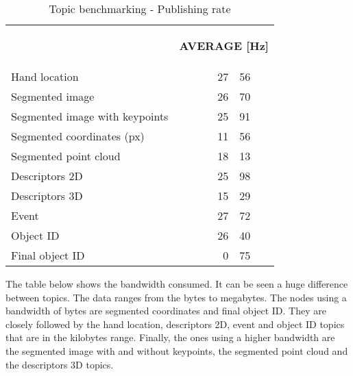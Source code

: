 \begin{itemize}
\begin{table}[H]
\centering
\caption[Topic benchmarking - Publishing rate]{Topic benchmarking - Publishing rate}
\begin{tabular} {l c r@{.}l }
\toprule
\addlinespace[3mm]
   \multicolumn{1}{c}{\begin{center}\textbf{TOPIC}\end{center}} &
   \multicolumn{3}{c}{\begin{center}\textbf{AVERAGE [Hz]}\end{center}} &\\
\addlinespace[-3mm]
\midrule
 Hand location && 27&56 \\
 Segmented  image & & 26&70 \\
 Segmented  image  with  keypoints & &25&91 \\
 Segmented  coordinates  (px) & &11&56 \\
 Segmented  point  cloud & &18&13 \\
 Descriptors  2D && 25&98 \\
 Descriptors  3D & &15&29 \\
Event && 27&72 \\
 Object ID && 26&40 \\
 Final  object  ID && 0&75 \\
\bottomrule
\end{tabular}
\label{hz}
\end{table}



			The table below shows the bandwidth consumed. 
			It can be seen a huge difference between topics. 
			The data ranges from the bytes to megabytes. 
			The nodes using a bandwidth of bytes are segmented coordinates and final object ID. 
			They are closely followed by the hand location, descriptors 2D, event and object ID topics that are in the kilobytes range. 
			Finally, the ones using a higher bandwidth are the segmented image with and without keypoints, the segmented point cloud and the descriptors 3D topics. 







\end{itemize}
